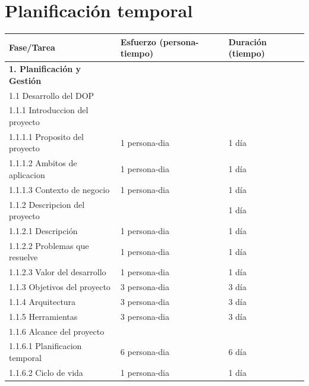 \documentclass{report}
\begin{document}
    \chapter{Planificación temporal} %
        \begin{center}
            \begin{longtable}{|p{7cm}|p{3cm}|p{3cm}|}
                \hline
                \textbf{Fase/Tarea} & \textbf{Esfuerzo (persona-tiempo)} & \textbf{Duración (tiempo)}\\
                \hline
                \hline
                \textbf{1. Planificación y Gestión} &  &  \\
                \hline
                1.1 Desarrollo del DOP &  & \\
                \hline
                1.1.1 Introduccion del proyecto &  & \\
                \hline
                1.1.1.1 Proposito del proyecto & 1 persona-dia & 1 día\\
                \hline
                1.1.1.2 Ambitos de aplicacion & 1 persona-dia & 1 día\\
                \hline
                1.1.1.3 Contexto de negocio & 1 persona-dia & 1 día\\
                \hline
                1.1.2 Descripcion del proyecto &  & 1 día\\
                \hline
                1.1.2.1 Descripción & 1 persona-dia & 1 día\\
                \hline
                1.1.2.2 Problemas que resuelve & 1 persona-dia & 1 día\\
                \hline
                1.1.2.3 Valor del desarrollo & 1 persona-dia & 1 día\\
                \hline
                1.1.3 Objetivos del proyecto & 3 persona-dia & 3 día\\
                \hline
                1.1.4 Arquitectura & 3 persona-dia & 3 día\\
                \hline
                1.1.5 Herramientas & 3 persona-dia & 3 día\\
                \hline
                1.1.6 Alcance del proyecto &  & \\
                \hline
                1.1.6.1 Planificacion temporal & 6 persona-dia & 6 día\\
                \hline
                1.1.6.2 Ciclo de vida & 1 persona-dia & 1 día\\
                \hline

\end{longtable}
\end{center}
\end{document}
